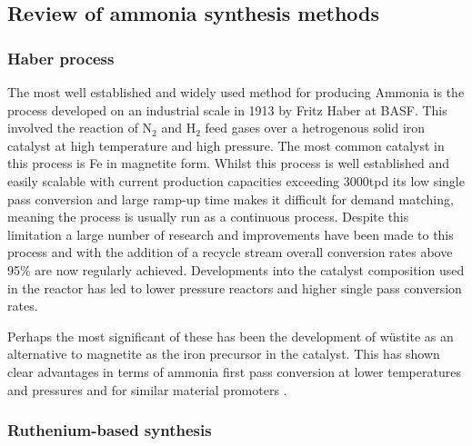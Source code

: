 \subsection{Review of ammonia synthesis methods}


\subsubsection{Haber process}
The most well established and widely used method for producing Ammonia is the process developed on an industrial scale in 1913 by Fritz Haber at BASF. This involved the reaction of N$_2$ and H$_2$ feed gases over a hetrogenous solid iron catalyst at high temperature and high pressure. The most common catalyst in this process is Fe in magnetite form. Whilst this process is well established and easily scalable with current production capacities exceeding 3000tpd \cite{Banares-alcantara2014} its low single pass conversion and large ramp-up time makes it difficult for demand matching, meaning the process is usually run as a continuous process. Despite this limitation a large number of research and improvements have been made to this process and with the addition of a recycle stream overall conversion rates above 95\% are now regularly achieved. Developments into the catalyst composition used in the reactor has led to lower pressure reactors and higher single pass conversion rates.

Perhaps the most significant of these has been the development of w\"{u}stite as an alternative to magnetite as the iron precursor in the catalyst. This has shown clear advantages in terms of ammonia first pass conversion at lower temperatures and pressures and for similar material promoters\cite{Pernicone2003} \cite{Liu1996}.


\subsubsection{Ruthenium-based synthesis}

